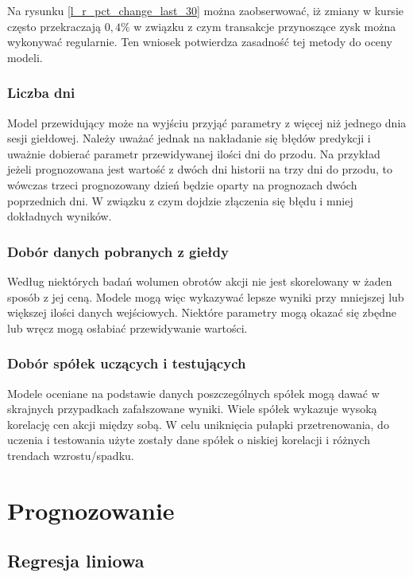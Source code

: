 \documentclass[a4paper, twoside, 11pt, openright]{article}
\begin{document}
Na rysunku \ref{l_r_pct_change_last_30} można zaobserwować, iż zmiany w kursie często przekraczają $0,4\%$ w związku z czym transakcje przynoszące zysk można wykonywać regularnie. Ten wniosek potwierdza zasadność tej metody do oceny modeli.

\subsubsection{Liczba dni}

Model przewidujący może na wyjściu przyjąć parametry z więcej niż jednego dnia sesji giełdowej. Należy uważać jednak na nakładanie się błędów predykcji i uważnie dobierać parametr przewidywanej ilości dni do przodu. Na przykład jeżeli prognozowana jest wartość z dwóch dni historii na trzy dni do przodu, to wówczas trzeci prognozowany dzień będzie oparty na prognozach dwóch poprzednich dni. W związku z czym dojdzie złączenia się błędu i mniej dokładnych wyników.

\subsubsection{Dobór danych pobranych z giełdy}

Według niektórych badań wolumen obrotów akcji nie jest skorelowany w żaden sposób z jej ceną. Modele mogą więc wykazywać lepsze wyniki przy mniejszej lub większej ilości danych wejściowych. Niektóre parametry mogą okazać się zbędne lub wręcz mogą osłabiać przewidywanie wartości.

\subsubsection{Dobór spółek uczących i testujących}

Modele oceniane na podstawie danych poszczególnych spółek mogą dawać w skrajnych przypadkach zafałszowane wyniki. Wiele spółek wykazuje wysoką korelację cen akcji między sobą. W celu uniknięcia pułapki przetrenowania, do uczenia i testowania użyte zostały dane spółek o niskiej korelacji i różnych trendach wzrostu/spadku.

\section{Prognozowanie}

\subsection{Regresja liniowa}
\end{document}
